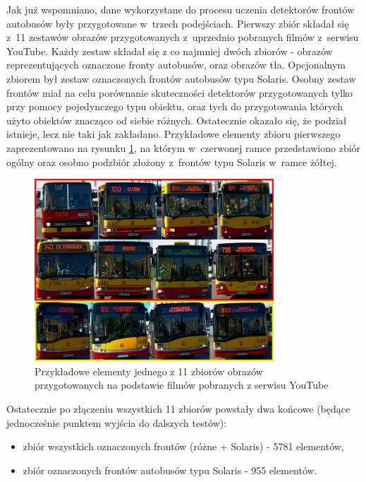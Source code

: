 Jak już wspomniano, dane wykorzystane do procesu uczenia detektorów frontów autobusów były przygotowane w~trzech podejściach.
Pierwszy zbiór składał się z~11 zestawów obrazów
przygotowanych z~uprzednio pobranych filmów z~serwisu YouTube.
Każdy zestaw składał się z co najmniej dwóch zbiorów - obrazów 
reprezentujących oznaczone fronty autobusów, oraz obrazów tła. 
Opcjonalnym zbiorem był zestaw oznaczonych 
frontów autobusów typu Solaris. Osobny zestaw frontów miał na celu
porównanie skuteczności detektorów przygotowanych tylko przy pomocy
pojedynczego typu obiektu, oraz tych do przygotowania których użyto
obiektów znacząco od siebie różnych. Ostatecznie okazało się,
że podział istnieje, lecz nie taki jak zakładano. Przykładowe
elementy zbioru pierwszego zaprezentowano na rysunku \ref{fig:jJ9ixBfVR5k_types}, na którym w~czerwonej ramce
przedstawiono zbiór ogólny oraz osobno podzbiór złożony z~frontów typu
Solaris w~ramce żółtej.

\begin{figure}[!h]
	\centering
	\includegraphics[width=0.8\textwidth]{img/exp_trainig_data_jJ9}
	\caption{Przykładowe elementy jednego z 11 zbiorów obrazów
		przygotowanych na podstawie
		filmów pobranych z serwisu YouTube}
	\label{fig:jJ9ixBfVR5k_types}
\end{figure}

Ostatecznie po złączeniu wszystkich 11 zbiorów powstały
dwa końcowe (będące jednocześnie punktem wyjścia do dalszych testów):
\begin{itemize}
    \item zbiór wszystkich oznaczonych frontów (różne + Solaris) 
        - 5781 elementów,
    \item zbiór oznaczonych frontów autobusów typu Solaris - 955
	    elementów.
\end{itemize}

